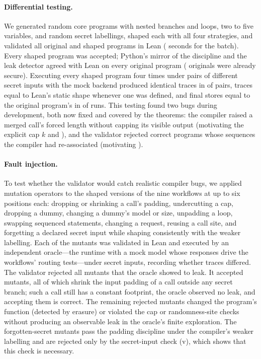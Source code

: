 \paragraph{Differential testing.} We generated \diffPrograms{} random core programs with nested branches and loops, two to five variables, and random secret labellings, shaped each with all four strategies, and validated all \diffLeanChecks{} original and shaped programs in Lean (\resDiffLeanSeconds{} seconds for the batch). Every shaped program was accepted; Python's mirror of the discipline and the leak detector agreed with Lean on every original program (\diffOrigAccepted{} originals were already secure). Executing every shaped program four times under pairs of different secret inputs with the mock backend produced identical traces in \diffTraceEqual{} of \diffPairs{} pairs, traces equal to Lean's static shape whenever one was defined, and final stores equal to the original program's in \diffStoreEqual{} of \diffRuns{} runs. This testing found two bugs during development, both now fixed and covered by the theorems: the compiler raised a merged call's forced length without capping its visible output (motivating the explicit cap $k$ and ), and the validator rejected correct programs whose sequences the compiler had re-associated (motivating ).

\paragraph{Fault injection.} To test whether the validator would catch realistic compiler bugs, we applied \mutOps{} mutation operators to the shaped versions of the nine workflows at up to six positions each: dropping or shrinking a call's padding, undercutting a cap, dropping a dummy, changing a dummy's model or size, unpadding a loop, swapping sequenced statements, changing a request, reusing a call site, and forgetting a declared secret input while shaping consistently with the weaker labelling. Each of the \mutTotal{} mutants was validated in Lean and executed by an independent oracle---the runtime with a mock model whose responses drive the workflows' routing tests---under \the{}\relax{} secret inputs, recording whether traces differed. The validator rejected all \mutLeak{} mutants that the oracle showed to leak. It accepted \mutAccepted{} mutants, all of which shrink the input padding of a call outside any secret branch; such a call still has a constant footprint, the oracle observed no leak, and accepting them is correct. The remaining rejected mutants changed the program's function (detected by erasure) or violated the cap or randomness-site checks without producing an observable leak in the oracle's finite exploration. The forgotten-secret mutants pass the padding discipline under the compiler's weaker labelling and are rejected only by the secret-input check (v), which shows that this check is necessary.
